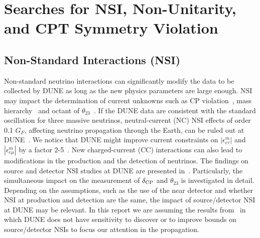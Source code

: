 


\clearpage
\section{Searches for NSI, Non-Unitarity, and CPT Symmetry Violation}
\subsection{Non-Standard Interactions (NSI)}
\label{sec:nsi}
Non-standard neutrino interactions can significantly modify the data to be collected by DUNE as long as the new physics parameters are large enough. NSI may impact the determination of current unknowns such as CP violation~\cite{Masud:2015xva,Masud:2016bvp}, mass hierarchy~\cite{Masud:2016gcl} and octant of $\theta_{23}$~\cite{Agarwalla:2016fkh}. If the DUNE data are consistent with the standard oscillation for three massive neutrinos, neutral-current (NC) NSI effects of order 0.1 $G_F$, affecting neutrino propagation through the Earth, can be ruled out at DUNE~\cite{deGouvea:2015ndi,Coloma:2015kiu}. We notice that DUNE might improve current constraints on $|\epsilon^m_{e \tau}|$ and $|\epsilon^m_{e \mu}|$ by a factor 2-5~\cite{Ohlsson:2012kf,Miranda:2015dra,Farzan:2017xzy}. New charged-current (CC) interactions can also lead to modifications in the production and the detection of neutrinos. The findings on source and detector NSI studies at DUNE are presented in~\cite{Blennow:2016etl,Bakhti:2016gic}. Particularly, the simultaneous impact on the measurement of $\delta_{\rm CP}$ and $\theta_{23}$ is investigated in detail. Depending on the assumptions, such as the use of the near detector and whether NSI at production and detection are the same, the impact of source/detector NSI at DUNE may be relevant. In this report we are assuming the results from~\cite{Blennow:2016etl} in which DUNE does not have sensitivity to discover or to improve bounds on source/detector NSIs to focus our attention in the propagation.

